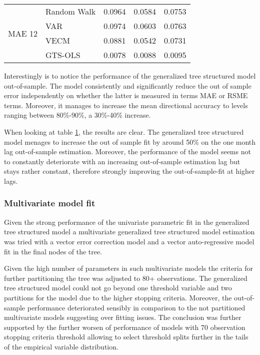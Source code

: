 \begin{table}[!h]
\begin{tabular}{llccc}
    \multirow{4}{*}{MAE 12}       & \multicolumn{1}{l}{Random Walk}             &   0.0964  & 0.0584  & 0.0753 \\
                                  & \multicolumn{1}{l}{VAR}                     &   0.0974  & 0.0603  & 0.0763 \\
                                  & \multicolumn{1}{l}{VECM}                    &   0.0881  & 0.0542  & 0.0731 \\
                                  & \multicolumn{1}{l}{GTS-OLS}                 &   0.0078  & 0.0088  & 0.0095 \\    
    \bottomrule
  \end{tabular}
  \label{table:GTS-OLS fit}
  \vspace{1em}  
\end{table}

Interestingly is to notice the performance of the generalized tree
structured model out-of-sample. The model consistently and
significantly reduce the out of sample error independently on whether
the latter is measured in terms MAE or RSME terms. Moreover, it
manages to increase the mean directional accuracy to levels ranging
between 80\%-90\%, a 30\%-40\% increase.

When looking at table \ref{table:GTS-OLS fit}, the results are
clear. The generalized tree structured model menages to increase the
out of sample fit by around 50\% on the one month lag out-of-sample
estimation. Moreover, the performance of the model seems not to
constantly deteriorate with an increasing out-of-sample estimation lag
but stays rather constant, therefore strongly improving the
out-of-sample-fit at higher lags.


\subsubsection{Multivariate model fit}

Given the strong performance of the univariate parametric fit in the
generalized tree structured model a multivariate generalized tree
structured model estimation was tried with a vector error correction
model and a vector auto-regressive model fit in the final nodes of the
tree.

Given the high number of parameters in such multivariate models the
criteria for further partitioning the tree was adjusted to 80+
observations. The generalized tree structured model could not go
beyond one threshold variable and two partitions for the model due to
the higher stopping criteria. Moreover, the out-of-sample performance
deteriorated sensibly in comparison to the not partitioned
multivariate models suggesting over fitting issues. The conclusion was
further supported by the further worsen of performance of models with
70 observation stopping criteria threshold allowing to select
threshold splits further in the tails of the empirical variable
distribution.

